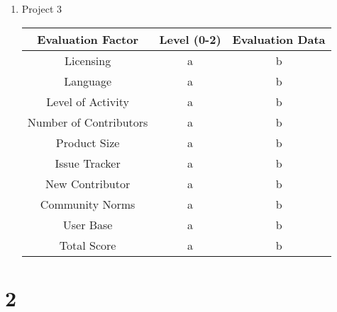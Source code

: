 \documentclass[12pt]{article}
\begin{document}
\begin{enumerate}
		\item Project 3
		
		\noindent\begin{tabular}{ |c|c|c| } 
			\hline
			Evaluation Factor & Level (0-2) & Evaluation Data \\\hline
			Licensing & a & b \\\hline
			Language & a & b \\\hline
			Level of Activity & a & b \\\hline		
			Number of Contributors & a & b \\\hline
			Product Size & a & b \\\hline
			Issue Tracker & a & b \\\hline
			New Contributor & a & b \\\hline
			Community Norms & a & b \\\hline
			User Base & a & b \\\hline
			Total Score & a & b \\\hline
		\end{tabular}
	
	\end{enumerate}
	
	
	
	\section{2}
	
\end{document}
